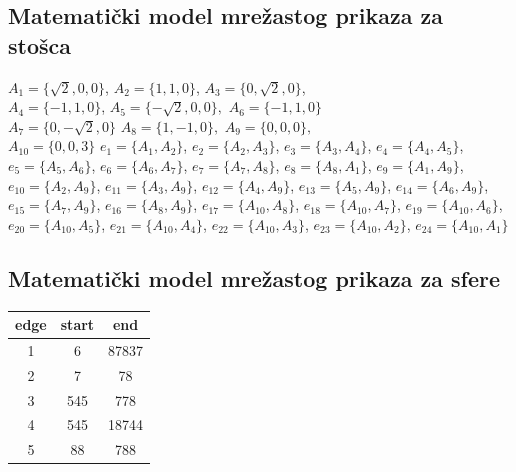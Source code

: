 \documentclass[a4paper,12pt]{article}
\begin{document}
    \subsection{Matematički model mrežastog prikaza za stošca}
\begin{flushleft}
    $A_1 = \{\sqrt{2},0,0\}$, 
    $A_2 = \{1,1,0\}$,
    $A_3 = \{0,\sqrt{2},0\}$,\\
    $A_4 = \{-1,1,0\}$,
    $A_5 = \{-\sqrt{2},0,0\},$
    $A_6 = \{-1,1,0\}$\\
    $A_7 = \{0,-\sqrt{2},0\}$
    $A_8 = \{1,-1,0\},$
    $A_9 = \{0,0,0\},$\\
    $A_{10} = \{0,0,3\}$
    \newline
    \newline
    $e_1 = \{A_{1},A_{2} \}$, 
    $e_2 = \{A_{2},A_{3} \}$, 
    $e_3 = \{A_{3},A_{4} \}$, 
    $e_4 = \{A_{4},A_{5} \}$, 
    $e_5 = \{A_{5},A_{6} \}$, 
    $e_6 = \{A_{6},A_{7} \}$, 
    $e_7 = \{A_{7},A_{8} \}$, 
    $e_8 = \{A_{8},A_{1} \}$, 
    $e_9 = \{A_{1},A_{9} \}$, 
    $e_{10} = \{A_{2},A_{9} \}$, 
    $e_{11} = \{A_{3},A_{9} \}$, 
    $e_{12} = \{A_{4},A_{9} \}$, 
    $e_{13} = \{A_{5},A_{9} \}$, 
    $e_{14} = \{A_{6},A_{9} \}$, 
    $e_{15} = \{A_{7},A_{9} \}$, 
    $e_{16} = \{A_{8},A_{9} \}$, 
    $e_{17} = \{A_{10},A_{8} \}$, 
    $e_{18} = \{A_{10},A_{7} \}$, 
    $e_{19} = \{A_{10},A_{6} \}$, 
    $e_{20} = \{A_{10},A_{5} \}$, 
    $e_{21} = \{A_{10},A_{4} \}$, 
    $e_{22} = \{A_{10},A_{3} \}$, 
    $e_{23} = \{A_{10},A_{2} \}$, 
    $e_{24} = \{A_{10},A_{1} \}$


  

    \end{flushleft}

    \subsection{Matematički model mrežastog prikaza za sfere}
\begin{flushleft}
    \begin{tabular}{||c | c | c ||} 
     \hline
     edge & start & end \\ [0.5ex] 
     \hline\hline
     1 & 6 & 87837  \\ 
     \hline
     2 & 7 & 78  \\
     \hline
     3 & 545 & 778  \\
     \hline
     4 & 545 & 18744 \\
     \hline
     5 & 88 & 788  \\ [1ex] 
     \hline
    \end{tabular}
    \end{flushleft}
\end{document}
